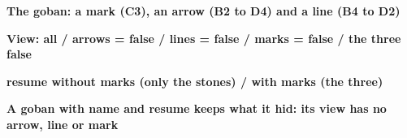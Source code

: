 \documentclass{article}
\newcommand\case[1]{\par\medskip\noindent\textbf{#1}\par\nopagebreak}
\begin{document}

\case{The goban: a mark (C3), an arrow (B2 to D4) and a line (B4 to D2)}
\begin{goban}[5, name = al]
\end{goban}

\case{View: all / arrows = false / lines = false / marks = false / the three false}

\case{resume without marks (only the stones) / with marks (the three)}
\begin{goban}[5, resume = al]\end{goban}
\begin{goban}[5, resume = {al, marks}]\end{goban}

\case{A goban with name and resume keeps what it hid: its view has no arrow, line or mark}
\begin{goban}[5, name = al2, resume = al]\end{goban}
\end{document}
